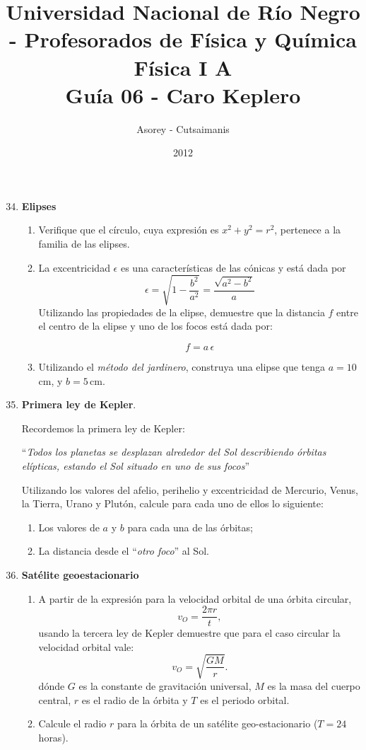 \documentclass[a4paper,12pt]{article}
\begin{document}
\title{
{\normalsize{Universidad Nacional de Río Negro - Profesorados de Física y
Química}}\\ Física I A \\ Guía 06 - Caro Keplero}
\author{Asorey - Cutsaimanis}
\date{2012}
\maketitle

\begin{enumerate}
\setcounter{enumi}{33}      %

\item {\bf{Elipses}}
\begin{enumerate}
\item Verifique que el círculo, cuya expresión es $x^2 + y^2 = r^2$, pertenece
a la familia de las elipses.
\item La excentricidad $\epsilon$ es una características de las cónicas y está
dada por 
\[ \epsilon = \sqrt{1 - \frac{b^2}{a^2}} = \frac{\sqrt{a^2-b^2}}{a}\]
Utilizando las propiedades de la elipse, demuestre que la distancia $f$ entre
el centro de la elipse y uno de los focos está dada por:

\[f=a \, \epsilon\]

\item Utilizando el {\emph{método del jardinero}}, construya una elipse que
tenga $a=10$\,cm, y $b=5$\,cm.
\end{enumerate}

\item{\bf{Primera ley de Kepler}}.

Recordemos la primera ley de Kepler: 

``{\emph{Todos los planetas se desplazan alrededor del Sol describiendo órbitas
elípticas, estando el Sol situado en uno de sus focos}}'' 

Utilizando los valores del afelio, perihelio y excentricidad de Mercurio,
Venus, la Tierra, Urano y Plutón, calcule para cada uno de ellos lo siguiente:

\begin{enumerate}
\item Los valores de $a$ y $b$ para cada una de las órbitas;
\item La distancia desde el ``{\emph{otro foco}}'' al Sol.
\end{enumerate}

\item{\bf{Satélite geoestacionario}}
\begin{enumerate}
\item A partir de la expresión para la velocidad orbital de una órbita circular,
\[v_O = \frac{2 \pi r}{t},\]
usando la tercera ley de Kepler demuestre que para el caso circular la velocidad orbital vale: 
\[v_O = \sqrt{\frac{GM}{r}}. \]
dónde $G$ es la constante de gravitación universal, $M$ es la masa del cuerpo
central, $r$ es el radio de la órbita y $T$ es el periodo orbital.  
\item Calcule el radio $r$ para la órbita de un satélite geo-estacionario ($T=24$\,horas).
\end{enumerate}


\end{enumerate}
\end{document}
